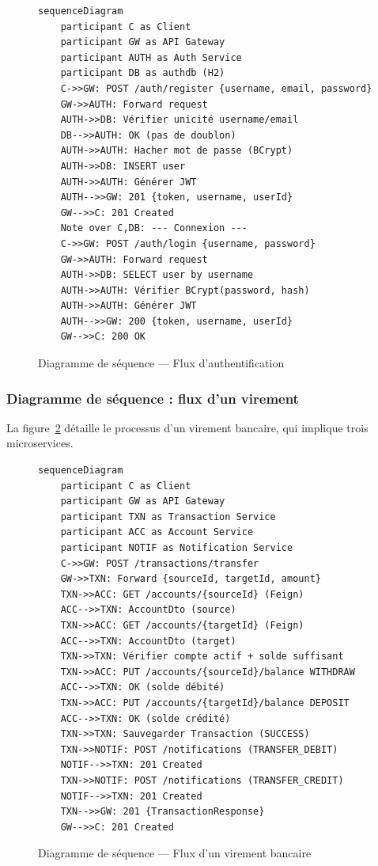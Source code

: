 \documentclass[12pt,a4paper]{article}
\begin{document}
\begin{figure}[H]
\centering
\begin{verbatim}
sequenceDiagram
    participant C as Client
    participant GW as API Gateway
    participant AUTH as Auth Service
    participant DB as authdb (H2)
    C->>GW: POST /auth/register {username, email, password}
    GW->>AUTH: Forward request
    AUTH->>DB: Vérifier unicité username/email
    DB-->>AUTH: OK (pas de doublon)
    AUTH->>AUTH: Hacher mot de passe (BCrypt)
    AUTH->>DB: INSERT user
    AUTH->>AUTH: Générer JWT
    AUTH-->>GW: 201 {token, username, userId}
    GW-->>C: 201 Created
    Note over C,DB: --- Connexion ---
    C->>GW: POST /auth/login {username, password}
    GW->>AUTH: Forward request
    AUTH->>DB: SELECT user by username
    AUTH->>AUTH: Vérifier BCrypt(password, hash)
    AUTH->>AUTH: Générer JWT
    AUTH-->>GW: 200 {token, username, userId}
    GW-->>C: 200 OK
\end{verbatim}
\caption{Diagramme de séquence --- Flux d'authentification}
\label{fig:seq_auth}
\end{figure}

\subsubsection{Diagramme de séquence : flux d'un virement}

La figure~\ref{fig:seq_transfer} détaille le processus d'un virement bancaire, qui implique trois microservices.

\begin{figure}[H]
\centering
\begin{verbatim}
sequenceDiagram
    participant C as Client
    participant GW as API Gateway
    participant TXN as Transaction Service
    participant ACC as Account Service
    participant NOTIF as Notification Service
    C->>GW: POST /transactions/transfer
    GW->>TXN: Forward {sourceId, targetId, amount}
    TXN->>ACC: GET /accounts/{sourceId} (Feign)
    ACC-->>TXN: AccountDto (source)
    TXN->>ACC: GET /accounts/{targetId} (Feign)
    ACC-->>TXN: AccountDto (target)
    TXN->>TXN: Vérifier compte actif + solde suffisant
    TXN->>ACC: PUT /accounts/{sourceId}/balance WITHDRAW
    ACC-->>TXN: OK (solde débité)
    TXN->>ACC: PUT /accounts/{targetId}/balance DEPOSIT
    ACC-->>TXN: OK (solde crédité)
    TXN->>TXN: Sauvegarder Transaction (SUCCESS)
    TXN->>NOTIF: POST /notifications (TRANSFER_DEBIT)
    NOTIF-->>TXN: 201 Created
    TXN->>NOTIF: POST /notifications (TRANSFER_CREDIT)
    NOTIF-->>TXN: 201 Created
    TXN-->>GW: 201 {TransactionResponse}
    GW-->>C: 201 Created
\end{verbatim}
\caption{Diagramme de séquence --- Flux d'un virement bancaire}
\label{fig:seq_transfer}
\end{figure}
\end{document}
